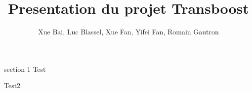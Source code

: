 \documentclass[newPxFont,numfooter,sectionpages]{beamer}
\title{Presentation du projet Transboost}
\author{Xue Bai, Luc Blassel, Xue Fan, Yifei Fan, Romain Gautron }
\begin{document}
\maketitle
\begin{frame}[c]{section 1}
  Test
\end{frame}
\begin{frame}
  Test2
\end{frame}
\end{document}
